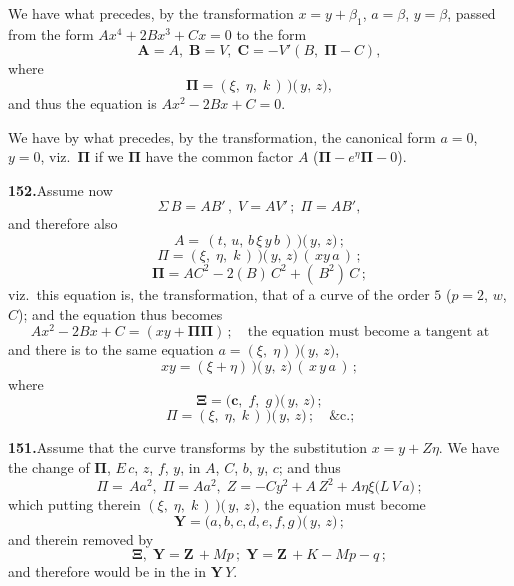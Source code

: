 \documentclass[11pt,a4paper]{article}
\begin{document}
We have what precedes, by the transformation $x = y + \beta_1$, $a = \beta$, $y = \beta$, passed from the form $A x^4 + 2B x^3 + Cx = 0$ to the form
\[
\mathbf{A} = A,\;\mathbf{B} = V,\;\mathbf{C} = -V'(B,\;\bm{\Pi} - C),
\]
where
\[
\bm{\Pi} = (\xi,\;\eta,\;k\,)\!\,\mbox{$)\!($}\,y,\,z),
\]
and thus the equation is $A x^2 - 2B x + C = 0$.

We have by what precedes, by the transformation, the canonical form $a = 0$, $y = 0$, viz.\ $\bm{\Pi}$ if we $\bm{\Pi}$ have the common factor $A$ ($\bm{\Pi} - e^{\eta}\bm{\Pi} - 0$).

\medskip\noindent\textbf{152.}\quad Assume now
\[
\Sigma\,B = AB'\,,\;V = AV'\,;\;\Pi = AB',
\]
and therefore also
\[
A = \,(t,\,u,\,b\,\xi\,y\,b\,)\!\,\mbox{$)\!($}\,y,\,z\bigr)\,;
\]
\[
\Pi = (\xi,\;\eta,\;k\,)\!\,\mbox{$)\!($}\,y,\,z\bigr)\,(\,xy\,a\,)\,;
\]
\[
\bm{\Pi} = A C^2 - 2(B)\,C^2 + (\,B^2)\,C\,;
\]
viz.\ this equation is, the transformation, that of a curve of the order $5$ ($p = 2$, $w$, $C$); and the equation thus becomes
\[
A x^2 - 2 B x + C = (xy + \bm{\Pi}\bm{\Pi})\,;\quad\text{the equation must become a tangent at}
\]
and there is to the same equation $a = (\xi,\;\eta)\!\,\mbox{$)\!($}\,y,\,z\bigr)$,
\[
xy = (\xi + \eta)\!\,\mbox{$)\!($}\,y,\,z\bigr)\,(\,x\,y\,a\,)\,;
\]
where
\[
\bm{\Xi} = (\bm{c},\;f,\;g\!\,\mbox{$)\!($}\,y,\,z\bigr)\,;
\]
\[
\Pi = (\xi,\;\eta,\;k\,)\!\,\mbox{$)\!($}\,y,\,z\bigr)\,;\quad\&\text{c.;}
\]

\medskip\noindent\textbf{151.}\quad Assume that the curve transforms by the substitution $x = y + Z\eta$. We have the change of $\bm{\Pi}$, $E\,c$, $z$, $f$, $y$, in $A$, $C$, $b$, $y$, $c$; and thus
\[
\Pi = \,Aa^2,\;\Pi = Aa^2,\;Z = -Cy^2 + A\,Z^2 + A\eta\xi\bigl(L\,V\,a\bigr)\,;
\]
which putting therein $(\xi,\;\eta,\;k\,)\!\,\mbox{$)\!($}\,y,\,z\bigr)$, the equation must become
\[
\bm{Y} = (a, b, c, d, e, f, g\!\,\mbox{$)\!($}\,y,\,z\bigr)\,;
\]
and therein removed by
\[
\bm{\Xi},\;\bm{Y} = \bm{Z}\,+ Mp\,;\;\bm{Y} = \bm{Z}\,+ K - Mp - q\,;
\]
and therefore would be in the in $\bm{Y}\,Y$.
\end{document}
